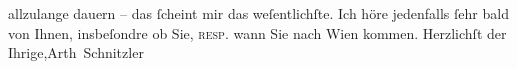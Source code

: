       allzulange dauern – das{ }ſcheint
      mir das weſentlichſte. Ich höre
      jedenfalls{ }ſehr bald von Ihnen, insbeſondre ob Sie, \textsc{resp}. wann Sie
      nach Wien kommen.\pend
           \pstart Herzlichſt der Ihrige,\spacefill\mbox{Arth Schnitzler}\pend{}\endnumbering{}  \newcommand{\dateiname}{L04345}\newcommand{\titel}{Arthur Schnitzler an Rainer Maria Rilke, 17. 1. 1902}\newcommand{\editorInnen}{Herausgegeben von Jahnke, SelmaMüller, Martin Anton}
